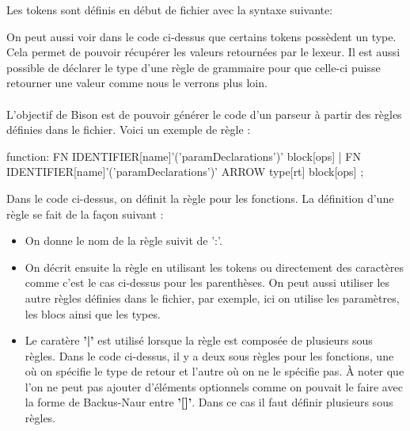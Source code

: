 \documentclass[a4paper]{article}%
\begin{document}
Les tokens sont définis en début de fichier avec la syntaxe suivante:

\begin{code}
\end{code}\leavevmode\newline


On peut aussi voir dans le code ci-dessus que certains tokens possèdent un type.
Cela permet de pouvoir récupérer les valeurs retournées par le lexeur. Il est
aussi possible de déclarer le type d'une règle de grammaire pour que celle-ci
puisse retourner une valeur comme nous le verrons plus loin.\\~\\


L'objectif de Bison est de pouvoir générer le code d'un parseur à partir des
règles définies dans le fichier. Voici un exemple de règle :

\begin{code}[language=c++]
function:
        FN IDENTIFIER[name]'('paramDeclarations')' block[ops]
        |
        FN IDENTIFIER[name]'('paramDeclarations')' ARROW type[rt] block[ops]
        ;
\end{code}\leavevmode\newline

Dans le code ci-dessus, on définit la règle pour les fonctions. La définition
d'une règle se fait de la façon suivant :

\begin{itemize}
  \item On donne le nom de la règle suivit de ':'.
  \item On décrit ensuite la règle en utilisant les tokens ou directement des
    caractères comme c'est le cas ci-dessus pour les parenthèses. On peut aussi
    utiliser les autre règles définies dans le fichier, par exemple, ici on
    utilise les paramètres, les blocs ainsi que les types.
  \item Le caratère \textbf{'|'} est utilisé lorsque la règle est composée de
    plusieurs sous règles. Dans le code ci-dessus, il y a deux sous règles pour
    les fonctions, une où on spécifie le type de retour et l'autre où on ne le
    spécifie pas. À noter que l'on ne peut pas ajouter d'éléments optionnels
    comme on pouvait le faire avec la forme de Backus-Naur entre \textbf{'[]'}.
    Dans ce cas il faut définir plusieurs sous règles.
\end{itemize}~\\
\end{document}
